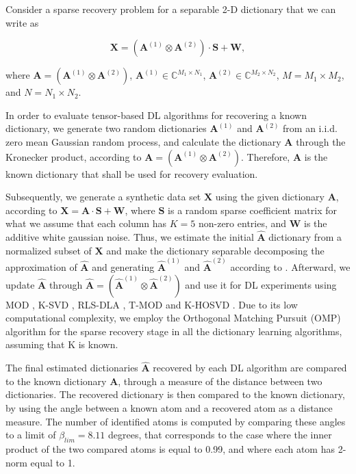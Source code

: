 Consider a sparse recovery problem for a separable 2-D dictionary that we can write as

\begin{equation}\label{eq:eq02}
\boldsymbol{X} = (\boldsymbol{A}^{(1)} \otimes \boldsymbol{A}^{(2)}) \cdot \boldsymbol{S} + \boldsymbol{W},
\end{equation}

where $\boldsymbol{A} = (\boldsymbol{A}^{(1)} \otimes \boldsymbol{A}^{(2)})$, $\boldsymbol{A}^{(1)} \in \mathbb{C}^{M_1 \times N_1}$, $\boldsymbol{A}^{(2)} \in \mathbb{C}^{M_2 \times N_2}$, $M = M_1 \times M_2$, and $N = N_1 \times N_2$.

In order to evaluate tensor-based DL algorithms for recovering a known dictionary, we generate two random dictionaries $\boldsymbol{A}^{(1)}$ and $\boldsymbol{A}^{(2)}$ from an i.i.d. zero mean Gaussian random process, and calculate the dictionary $\boldsymbol{A}$ through the Kronecker product, according to $\boldsymbol{A} = (\boldsymbol{A}^{(1)} \otimes \boldsymbol{A}^{(2)})$. Therefore, $\boldsymbol{A}$ is the known dictionary that shall be used for recovery evaluation. 

Subsequently, we generate a synthetic data set $\boldsymbol{X}$ using the given dictionary $\boldsymbol{A}$, according to $\boldsymbol{X} = \boldsymbol{A} \cdot \boldsymbol{S} + \boldsymbol{W}$, where $\boldsymbol{S}$ is a random sparse coefficient matrix for what we assume that each column has $K = 5$ non-zero entries, and $\boldsymbol{W}$ is the additive white gaussian noise. Thus, we estimate the initial $\boldsymbol{\hat{A}}$ dictionary from a normalized subset of $\boldsymbol{X}$ and make the dictionary separable decomposing the approximation of $\boldsymbol{\hat{A}}$ and generating $\boldsymbol{\hat{A}}^{(1)}$ and $\boldsymbol{\hat{A}}^{(2)}$ according to \cite{van1993approximation}. Afterward, we update $\boldsymbol{\hat{A}}$ through $\boldsymbol{\hat{A}} = (\boldsymbol{\hat{A}}^{(1)} \otimes \boldsymbol{\hat{A}}^{(2)})$ and use it for DL experiments using MOD \cite{engan1999method}, K-SVD \cite{aharon2006rm}, RLS-DLA \cite{skretting2010recursive}, T-MOD \cite{roemer2014tensor} and K-HOSVD \cite{roemer2014tensor}. Due to its low computational complexity, we employ the Orthogonal Matching Pursuit (OMP) algorithm\cite{davis1997adaptive} for the sparse recovery stage in all the dictionary learning algorithms, assuming that K is known. 

The final estimated dictionaries $\boldsymbol{\hat{A}}$ recovered by each DL algorithm are compared to the known dictionary $\boldsymbol{A}$, through a measure of the distance between two dictionaries. The recovered dictionary is then compared to the known dictionary, by using the angle between a known atom and a recovered atom as a distance measure. The number of identified atoms is computed by comparing these angles to a limit of $\beta_{lim} = 8.11$ degrees, that corresponds to the case where the inner product of the two compared atoms is equal to 0.99, and where each atom has 2-norm equal to 1.

